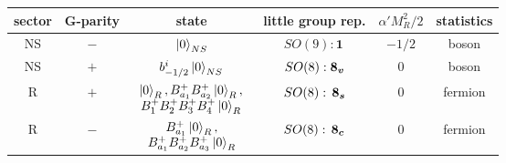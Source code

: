 \begin{tabular}{|c|c|c|c|c|c|}
	\hline  sector     & G-parity             & state                                          & little group rep.               & $\alpha' M^2_R /2$   & statistics       \\ \hline
	NS                 & $-$                  & $\ket{0}_{NS}$                                 & $SO(9): \bm{1} \,$                  & $-1/2$               & boson            \\ \hline
	NS                 & $+$                  & $b^i_{-1/2} \ket{0}_{NS}$                      & $SO(8): \boldsymbol{8_v}$                     & $0$                  & boson            \\ \hline
	\multirow{2}{*}{R} & \multirow{2}{*}{$+$} & \multirow{2}{*}{$\begin{array}{c}
				                                                             \ket{0}_{R}, B^+_{a_1}B^+_{a_2}\ket{0}_{R}, \\
				                                                             B^+_{1}B^+_{2}B^+_{3}B^+_{4} \ket{0}_{R}
			                                                             \end{array}$} & \multirow{2}{*}{$SO(8): \, \boldsymbol{8_s}$} & \multirow{2}{*}{$0$} & \multirow{2}{*}{fermion}         \\
	                   &                      &                                                &                                 &                      &                  \\ \hline
	\multirow{2}{*}{R} & \multirow{2}{*}{$-$} & \multirow{2}{*}{$\begin{array}{c}
				                                                             B^+_{a_1} \ket{0}_{R}, \\
				                                                             B^+_{a_1}B^+_{a_2}B^+_{a_3}\ket{0}_{R}
			                                                             \end{array}$}         & \multirow{2}{*}{$SO(8): \, \boldsymbol{8_c}$} & \multirow{2}{*}{$0$} & \multirow{2}{*}{fermion} \\
	                   &                      &                                                &                                 &                      &                  \\ \hline
\end{tabular}